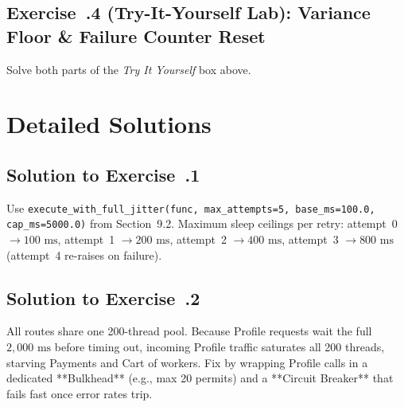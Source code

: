 \subsection*{Exercise~\thechapter.4 (Try-It-Yourself Lab): Variance Floor \& Failure Counter Reset}
Solve both parts of the \emph{Try It Yourself} box above.

\section{Detailed Solutions}

\subsection*{Solution to Exercise~\thechapter.1}
Use \texttt{execute\_with\_full\_jitter(func, max\_attempts=5, base\_ms=100.0, cap\_ms=5000.0)} from Section~9.2. Maximum sleep ceilings per retry: attempt~0 $\to 100\text{ ms}$, attempt~1 $\to 200\text{ ms}$, attempt~2 $\to 400\text{ ms}$, attempt~3 $\to 800\text{ ms}$ (attempt~4 re-raises on failure).

\subsection*{Solution to Exercise~\thechapter.2}
All routes share one 200-thread pool. Because Profile requests wait the full $2{,}000\text{ ms}$ before timing out, incoming Profile traffic saturates all 200 threads, starving Payments and Cart of workers. Fix by wrapping Profile calls in a dedicated **Bulkhead** (e.g., max 20 permits) and a **Circuit Breaker** that fails fast once error rates trip.

